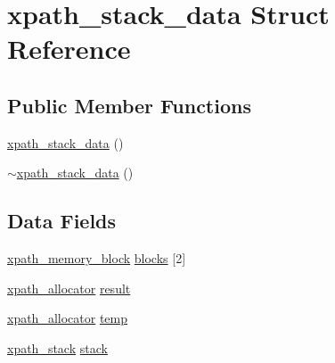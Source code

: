\hypertarget{structxpath__stack__data}{\section{xpath\-\_\-stack\-\_\-data Struct Reference}
\label{structxpath__stack__data}
}
\subsection*{Public Member Functions}
\begin{DoxyCompactItemize}
\item 
\hyperlink{structxpath__stack__data_aba4a588075a5ec45a3aa661b97d62ca6}{xpath\-\_\-stack\-\_\-data} ()
\item 
\hyperlink{structxpath__stack__data_a1df4e020ecc629b398336969c8490d98}{$\sim$xpath\-\_\-stack\-\_\-data} ()
\end{DoxyCompactItemize}
\subsection*{Data Fields}
\begin{DoxyCompactItemize}
\item 
\hyperlink{structxpath__memory__block}{xpath\-\_\-memory\-\_\-block} \hyperlink{structxpath__stack__data_a6821cc444dd65d997467fd3f757f4aff}{blocks} \mbox{[}2\mbox{]}
\item 
\hyperlink{classxpath__allocator}{xpath\-\_\-allocator} \hyperlink{structxpath__stack__data_ab073a685c66383ded44076993afe62d6}{result}
\item 
\hyperlink{classxpath__allocator}{xpath\-\_\-allocator} \hyperlink{structxpath__stack__data_a56e6bb486d52f4c5c2d02370e1b41058}{temp}
\item 
\hyperlink{structxpath__stack}{xpath\-\_\-stack} \hyperlink{structxpath__stack__data_ad26a92328f9aaf83fa62cb6695dbee90}{stack}
\end{DoxyCompactItemize}


